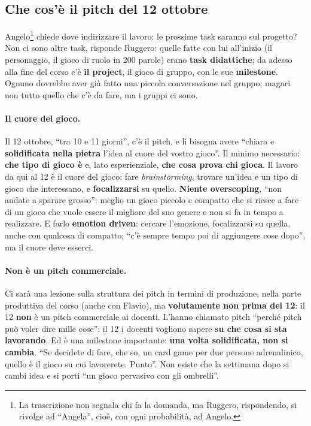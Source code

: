 \subsection{Che cos'è il pitch del 12 ottobre}
\label{a7:sec:tut-pitch}

Angelo\footnote{La trascrizione non segnala chi fa la domanda, ma Ruggero,
rispondendo, si rivolge ad ``Angela'', cioè, con ogni probabilità, ad Angelo.}
chiede dove indirizzare il lavoro: le prossime task saranno sul progetto? Non ci sono altre task, risponde Ruggero: quelle fatte con lui all'inizio
(il personaggio, il gioco di ruolo in 200 parole) erano \textbf{task didattiche}; da
adesso alla fine del corso c'è \textbf{il project}, il gioco di gruppo, con le sue
\textbf{milestone}. Ognuno dovrebbe aver già fatto una piccola conversazione nel
gruppo; magari non tutto quello che c'è da fare, ma i gruppi ci sono.

\paragraph{Il cuore del gioco.} Il 12 ottobre, ``tra 10 e 11 giorni'', c'è il pitch,
e lì bisogna avere ``chiara e \textbf{solidificata nella pietra} l'idea al cuore del
vostro gioco''. Il minimo necessario: \textbf{che tipo di gioco è} e, lato
esperienziale, \textbf{che cosa prova chi gioca}. Il lavoro da qui al 12 è il cuore
del gioco: fare \emph{brainstorming}, trovare un'idea e un tipo di gioco che
interessano, e \textbf{focalizzarsi} su quello. \textbf{Niente overscoping}, ``non
andate a sparare grosso'': meglio un gioco piccolo e compatto che si riesce a fare di
un gioco che vuole essere il migliore del suo genere e non si fa in tempo a realizzare.
E farlo \textbf{emotion driven}: cercare l'emozione, focalizzarsi su quella, anche con
qualcosa di compatto; ``c'è sempre tempo poi di aggiungere cose dopo'', ma il cuore
deve esserci.

\paragraph{Non è un pitch commerciale.} Ci sarà una lezione sulla struttura dei pitch
in termini di produzione, nella parte produttiva del corso (anche con Flavio), ma
\textbf{volutamente non prima del 12}: il 12 \textbf{non} è un pitch commerciale ai
docenti. L'hanno chiamato pitch ``perché pitch può voler dire mille cose'': il 12 i
docenti vogliono sapere \textbf{su che cosa si sta lavorando}. Ed è una milestone
importante: \textbf{una volta solidificata, non si cambia}. ``Se decidete di fare, che
so, un card game per due persone adrenalinico, quello è il gioco su cui lavorerete.
Punto''. Non esiste che la settimana dopo si cambi idea e si porti ``un gioco
pervasivo con gli ombrelli''.

